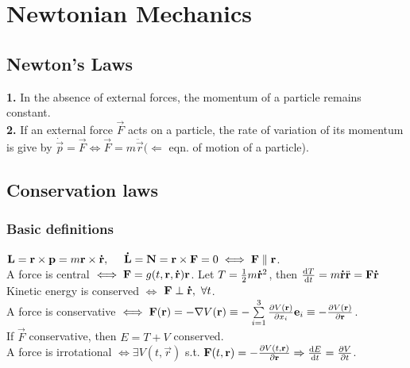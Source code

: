 \section{Newtonian Mechanics}



\subsection{Newton's Laws}
   \textbf{1.} In the absence of external forces, the momentum of a particle remains constant.\\
   \textbf{2.} If an external force $\vec{F}$ acts on a particle, the rate of variation of its momentum is give by $\dot{\vec{p}}=\vec{F}\iff \vec{F}=m\ddot{\vec{r}}(\Leftarrow$ eqn. of motion of a particle).




\subsection{Conservation laws}



\subsubsection*{Basic definitions}
$\vec{L}=\vec{r}\times\vec{p}=m\vec{r}\times\dotv{r},\ \ \ \ \dotv{L}=\vec{N}=\vec{r}\times\vec{F}=0\iff \vec{F}\parallel\vec{r}$.\\
A force is central $\iff \mathbf{F}=g(t,\mathbf{r},\accentset{\mbox{\bfseries .}}{\mathbf{r}})\mathbf{r}$. Let $T=\frac{1}{2}m\accentset{\mbox{\bfseries .}}{\mathbf{r}}^{2}$, then $\dv{T}{t}=m\accentset{\mbox{\bfseries .}}{\mathbf{r}}\ddot{\mathbf{r}}=\mathbf{F}\accentset{\mbox{\bfseries .}}{\mathbf{r}}$\\
Kinetic energy is conserved $\iff$ $\mathbf{F}\perp\accentset{\mbox{\bfseries .}}{\mathbf{r}},\ \forall t$.\\
A force is conservative $\iff \mathbf{F}(\mathbf{r})=-\nabla V(\mathbf{r})\equiv-\sum\limits_{i=1}^{3}\pdv{V(\mathbf{r})}{x_{i}}\mathbf{e}_{i}\equiv-\pdv{V(\mathbf{r})}{\mathbf{r}}$.\\
If $\vec{F}$ conservative, then $E=T+V$ conserved.\\
A force is irrotational $\iff \exists V(t,\vec{r})$ s.t. $\mathbf{F}(t,\mathbf{r})=-\pdv{V(t,\mathbf{r})}{\mathbf{r}}\Rightarrow \dv{E}{t}=\pdv{V}{t}$.



